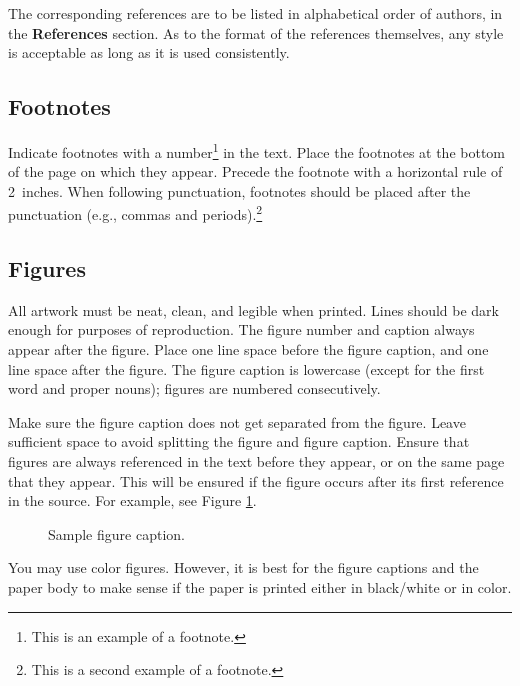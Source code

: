 \documentclass[10pt]{article} %
\theoremstyle{plain}
\theoremstyle{definition}
\theoremstyle{remark}
\begin{document}
The corresponding references are to be listed in alphabetical order of authors, in the \textbf{References} section. As to the format of the references themselves, any style is acceptable as long as it is used consistently.

\subsection{Footnotes}
\label{sec:footnotes}
Indicate footnotes with a number\footnote{This is an example of a footnote.} in the text. Place the footnotes at the bottom of the page on which they appear. Precede the footnote with a horizontal rule of 2~inches. When following punctuation, footnotes should be placed after the punctuation (e.g., commas and periods).\footnote{This is a second example of a footnote.}

\subsection{Figures}
\label{sec:figures}
All artwork must be neat, clean, and legible when printed. Lines should be dark enough for purposes of reproduction. The figure number and caption always appear after the figure. Place one line space before the figure caption, and one line space after the figure. The figure caption is lowercase (except for the first word and proper nouns); figures are numbered consecutively.

Make sure the figure caption does not get separated from the figure. Leave sufficient space to avoid splitting the figure and figure caption. Ensure that figures are always referenced in the text before they appear, or on the same page that they appear. This will be ensured if the figure occurs after its first reference in the source. For example, see Figure \ref{fig:example}.

\begin{figure}[ht]
    \begin{center}
        \fbox{\rule[-.5cm]{0cm}{4cm} \rule[-.5cm]{4cm}{0cm}}
    \end{center}
    \caption{Sample figure caption.}
    \label{fig:example}
\end{figure}

You may use color figures. However, it is best for the figure captions and the paper body to make sense if the paper is printed either in black/white or in color.
\end{document}
